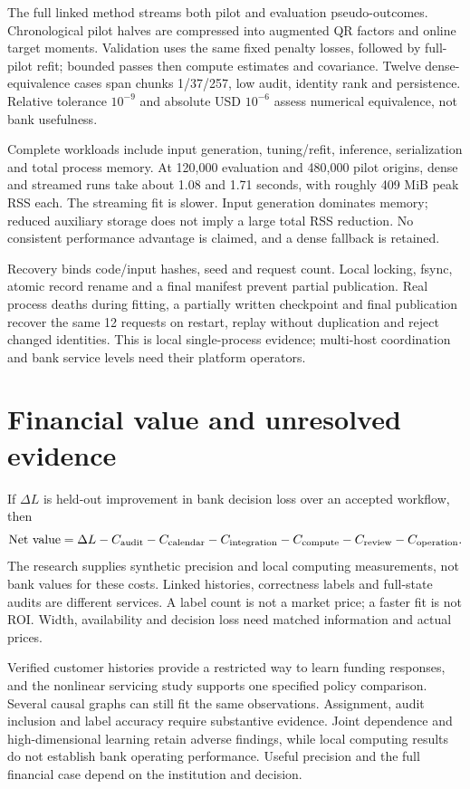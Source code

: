 The full linked method streams both pilot and evaluation pseudo-outcomes. Chronological pilot halves are compressed into augmented QR factors and online target moments. Validation uses the same fixed penalty losses, followed by full-pilot refit; bounded passes then compute estimates and covariance. Twelve dense-equivalence cases span chunks 1/37/257, low audit, identity rank and persistence. Relative tolerance $10^{-9}$ and absolute USD $10^{-6}$ assess numerical equivalence, not bank usefulness.

Complete workloads include input generation, tuning/refit, inference, serialization and total process memory. At 120,000 evaluation and 480,000 pilot origins, dense and streamed runs take about 1.08 and 1.71 seconds, with roughly 409 MiB peak RSS each. The streaming fit is slower. Input generation dominates memory; reduced auxiliary storage does not imply a large total RSS reduction. No consistent performance advantage is claimed, and a dense fallback is retained.

Recovery binds code/input hashes, seed and request count. Local locking, fsync, atomic record rename and a final manifest prevent partial publication. Real process deaths during fitting, a partially written checkpoint and final publication recover the same 12 requests on restart, replay without duplication and reject changed identities. This is local single-process evidence; multi-host coordination and bank service levels need their platform operators.

\section{Financial value and unresolved evidence}
If $\Delta L$ is held-out improvement in bank decision loss over an accepted workflow, then
\[
 \mathrm{Net\ value}=\Delta L-C_{\rm audit}-C_{\rm calendar}-C_{\rm integration}
 -C_{\rm compute}-C_{\rm review}-C_{\rm operation}.
\]
The research supplies synthetic precision and local computing measurements, not bank values for these costs. Linked histories, correctness labels and full-state audits are different services. A label count is not a market price; a faster fit is not ROI. Width, availability and decision loss need matched information and actual prices.

Verified customer histories provide a restricted way to learn funding
responses, and the nonlinear servicing study supports one specified policy
comparison. Several causal graphs can still fit the same observations.
Assignment, audit inclusion and label accuracy require substantive evidence.
Joint dependence and high-dimensional learning retain adverse findings, while
local computing results do not establish bank operating performance. Useful
precision and the full financial case depend on the institution and decision.

